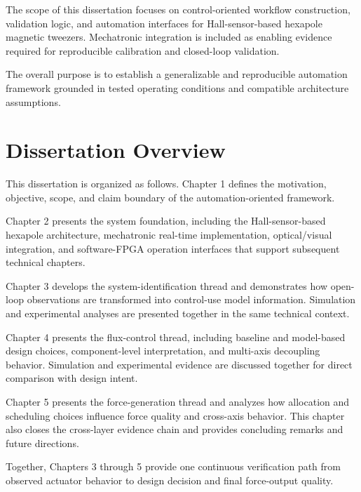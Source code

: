 The scope of this dissertation focuses on control-oriented workflow construction, validation logic, and automation interfaces for Hall-sensor-based hexapole magnetic tweezers. Mechatronic integration is included as enabling evidence required for reproducible calibration and closed-loop validation.

The overall purpose is to establish a generalizable and reproducible automation framework grounded in tested operating conditions and compatible architecture assumptions.

\section{Dissertation Overview}

This dissertation is organized as follows. Chapter 1 defines the motivation, objective, scope, and claim boundary of the automation-oriented framework.

Chapter 2 presents the system foundation, including the Hall-sensor-based hexapole architecture, mechatronic real-time implementation, optical/visual integration, and software-FPGA operation interfaces that support subsequent technical chapters.

Chapter 3 develops the system-identification thread and demonstrates how open-loop observations are transformed into control-use model information. Simulation and experimental analyses are presented together in the same technical context.

Chapter 4 presents the flux-control thread, including baseline and model-based design choices, component-level interpretation, and multi-axis decoupling behavior. Simulation and experimental evidence are discussed together for direct comparison with design intent.

Chapter 5 presents the force-generation thread and analyzes how allocation and scheduling choices influence force quality and cross-axis behavior. This chapter also closes the cross-layer evidence chain and provides concluding remarks and future directions.

Together, Chapters 3 through 5 provide one continuous verification path from observed actuator behavior to design decision and final force-output quality.
